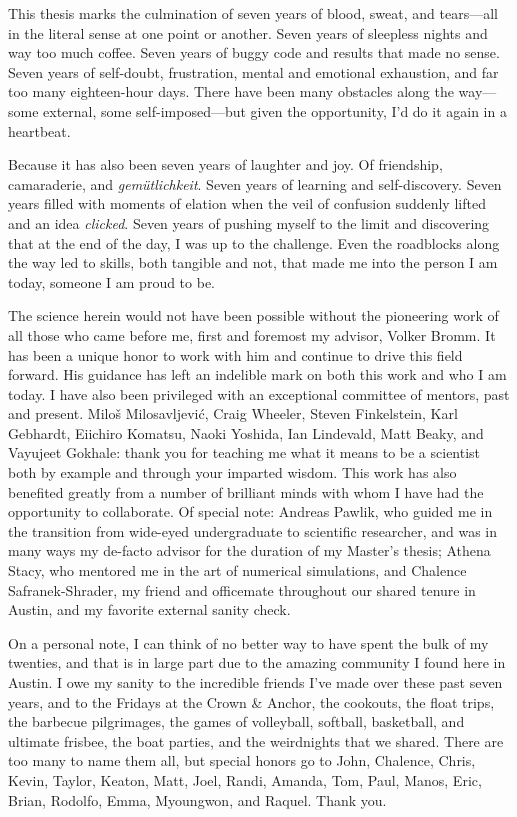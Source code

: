 \documentclass[12pt,double]{thesis}
\begin{document}
\begin{UTacknowledgements}
This thesis marks the culmination of seven years of blood, sweat, and tears---all in the literal sense at one point or another. Seven years of sleepless nights and way too much coffee. Seven years of buggy code and results that made no sense. Seven years of self-doubt, frustration, mental and emotional exhaustion, and far too many eighteen-hour days. There have been many obstacles along the way---some external, some self-imposed---but given the opportunity, I'd do it again in a heartbeat.

Because it has also been seven years of laughter and joy. Of friendship, camaraderie, and \textit{gemütlichkeit}. Seven years of learning and self-discovery.  Seven years filled with moments of elation when the veil of confusion suddenly lifted and an idea \textit{clicked}. Seven years of pushing myself to the limit and discovering that at the end of the day, I was up to the challenge. Even the roadblocks along the way led to skills, both tangible and not, that made me into the person I am today, someone I am proud to be.

The science herein would not have been possible without the pioneering work of all those who came before me, first and foremost my advisor, Volker Bromm. 
It has been a unique honor to work with him and continue to drive this field forward.  
His guidance has left an indelible mark on both this work and who I am today.  
I have also been privileged with an exceptional committee of mentors, past and present. Milo\v s Milosavljevi\'c, Craig Wheeler, Steven Finkelstein, Karl Gebhardt, Eiichiro Komatsu, Naoki Yoshida, Ian Lindevald, Matt Beaky, and Vayujeet Gokhale: thank you for teaching me what it means to be a scientist both by example and through your imparted wisdom.  This work has also benefited greatly from a number of brilliant minds with whom I have had the opportunity to collaborate. Of special note: Andreas Pawlik, who guided me in the transition from wide-eyed undergraduate to scientific researcher, and was in many ways my de-facto advisor for the duration of my Master's thesis; Athena Stacy, who mentored me in the art of numerical simulations, and Chalence Safranek-Shrader, my friend and officemate throughout our shared tenure in Austin, and my favorite external sanity check.

On a personal note, I can think of no better way to have spent the bulk of my twenties, and that is in large part due to the amazing community I found here in Austin.  I owe my sanity to the incredible friends I've made over these past seven years, and to the Fridays at the Crown \& Anchor, the cookouts, the float trips, the barbecue pilgrimages, the games of volleyball, softball, basketball, and ultimate frisbee, the boat parties, and the weirdnights that we shared.  There are too many to name them all, but special honors go to John, Chalence, Chris, Kevin, Taylor, Keaton, Matt, Joel, Randi, Amanda, Tom, Paul, Manos, Eric, Brian, Rodolfo, Emma, Myoungwon, and Raquel. Thank you.


\end{UTacknowledgements}
\end{document}
